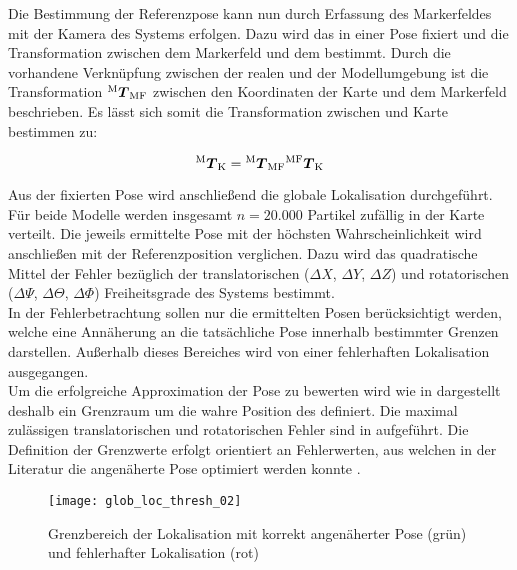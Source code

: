 Die Bestimmung der Referenzpose kann nun durch Erfassung des Markerfeldes mit der Kamera des Systems erfolgen. Dazu wird das \kps{} in einer Pose fixiert und die Transformation zwischen dem Markerfeld und dem \kps{} bestimmt. Durch die vorhandene Verknüpfung zwischen der realen und der Modellumgebung ist die Transformation ${^{\mathrm{M}}\mbox{\boldmath{$T$}}_{\mathrm{MF}}}$ zwischen den Koordinaten der Karte und dem Markerfeld beschrieben\red[ Bild?]. Es lässt sich somit die Transformation zwischen \kps{} und Karte bestimmen zu:

\begin{equation}
{^{\mathrm{M}}\mbox{\boldmath{$T$}}_{\mathrm{K}}} = {^{\mathrm{M}}\mbox{\boldmath{$T$}}_{\mathrm{MF}}}{^{\mathrm{MF}}\mbox{\boldmath{$T$}}_{\mathrm{K}}}
\end{equation}

Aus der fixierten Pose wird anschließend die globale Lokalisation durchgeführt. Für beide Modelle werden insgesamt $n=20.000$ Partikel zufällig in der Karte verteilt. Die jeweils ermittelte Pose mit der höchsten Wahrscheinlichkeit wird anschließen mit der Referenzposition verglichen. Dazu wird das quadratische Mittel der Fehler bezüglich der translatorischen ($\Delta X$, $\Delta Y$, $\Delta Z$) und rotatorischen ($\Delta \Psi$, $\Delta \Theta$, $\Delta \Phi$) Freiheitsgrade des Systems bestimmt.\\

In der Fehlerbetrachtung sollen nur die ermittelten Posen berücksichtigt werden, welche eine Annäherung an die tatsächliche Pose innerhalb bestimmter Grenzen darstellen. Außerhalb dieses Bereiches wird von einer fehlerhaften Lokalisation ausgegangen.\\
Um die erfolgreiche Approximation der Pose zu bewerten wird wie in  dargestellt deshalb ein Grenzraum um die wahre Position des  definiert. Die maximal zulässigen translatorischen und rotatorischen Fehler sind in  aufgeführt. Die Definition der Grenzwerte erfolgt orientiert an Fehlerwerten, aus welchen in der Literatur die angenäherte Pose optimiert werden konnte \cite{Forster2013}.\\

\begin{figure}[!ht]
	\begin{center}
		\texttt{[image: glob\_loc\_thresh\_02]}
		\caption{Grenzbereich der Lokalisation mit korrekt angenäherter Pose (grün) und fehlerhafter Lokalisation (rot)}
		\label{fig.loclimits}
	\end{center}
\end{figure}

